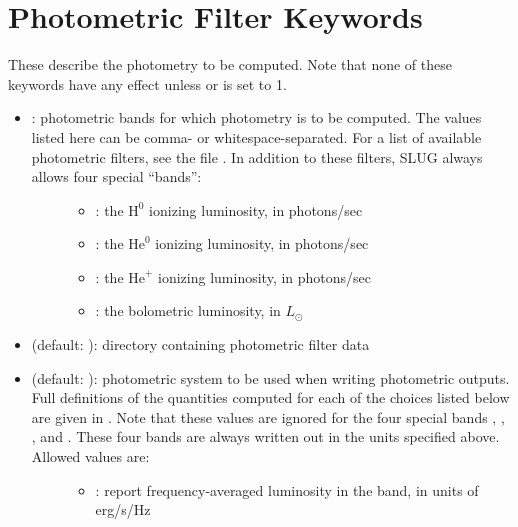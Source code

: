 \documentclass[letterpaper,10pt,english]{sphinxmanual}
\begin{document}
\section{Photometric Filter Keywords}
\label{parameters:ssec-phot-keywords}\label{parameters:photometric-filter-keywords}
These describe the photometry to be computed. Note that none of these keywords have any effect unless  or  is set to 1.
\begin{itemize}
\item {} \begin{description}
\item[{: photometric bands for which photometry is to be computed. The values listed here can be comma- or whitespace-separated. For a list of available photometric filters, see the file . In addition to these filters, SLUG always allows four special ``bands'':}] \leavevmode\begin{itemize}
\item {} 
: the \(\mathrm{H}^0\) ionizing luminosity, in photons/sec

\item {} 
: the \(\mathrm{He}^0\) ionizing luminosity, in photons/sec

\item {} 
: the \(\mathrm{He}^+\) ionizing luminosity, in photons/sec

\item {} 
: the bolometric luminosity, in \(L_\odot\)

\end{itemize}

\end{description}

\item {} 
 (default: ): directory containing photometric filter data

\item {} \begin{description}
\item[{ (default: ): photometric system to be used when writing photometric outputs. Full definitions of the quantities computed for each of the choices listed below are given in {\hyperref[intro:ssec-spec-phot]{\emph{}}}. Note that these values are ignored for the four special bands , , , and . These four bands are always written out in the units specified above. Allowed values are:}] \leavevmode\begin{itemize}
\item {} 
: report frequency-averaged luminosity in the band, in units of erg/s/Hz


\end{itemize}
\end{description}
\end{itemize}
\end{document}
